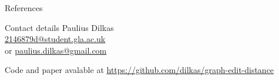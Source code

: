 \documentclass{beamer}
\begin{document}
\begin{frame}[allowframebreaks]{References}
  \printbibliography
\end{frame}
\begin{frame}
  \begin{block}{Contact details}
    Paulius Dilkas \\
    \url{2146879d@student.gla.ac.uk} \\
    or \url{paulius.dilkas@gmail.com}
  \end{block}
  \bigskip
  \begin{block}{Code and paper avalable at}
    \url{https://github.com/dilkas/graph-edit-distance}
  \end{block}
\end{frame}
\end{document}
